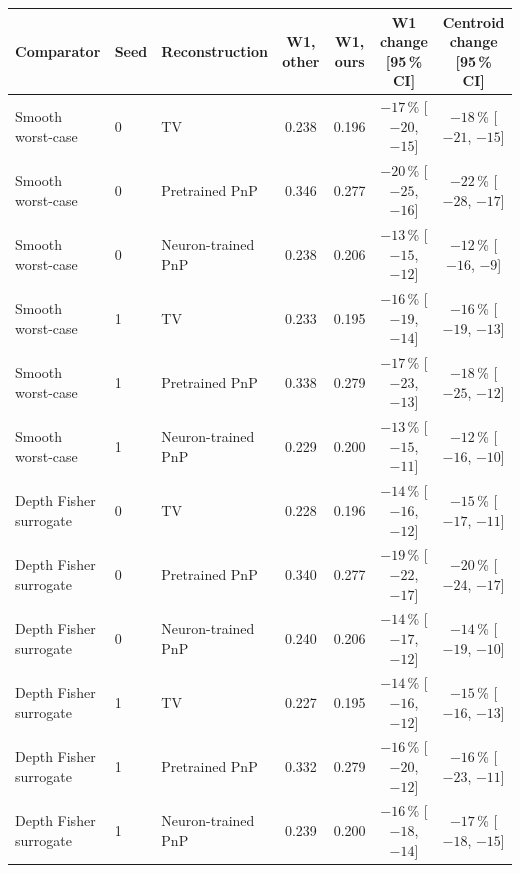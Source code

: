 \begin{tabular}{@{}lllcccc@{}}
\toprule
Comparator & Seed & Reconstruction & W1, other & W1, ours & W1 change [95\,\% CI] & Centroid change [95\,\% CI]\\
\midrule
Smooth worst-case & 0 & TV & 0.238 & 0.196 & $-17$\,\% [$-20$, $-15$] & $-18$\,\% [$-21$, $-15$]\\
Smooth worst-case & 0 & Pretrained PnP & 0.346 & 0.277 & $-20$\,\% [$-25$, $-16$] & $-22$\,\% [$-28$, $-17$]\\
Smooth worst-case & 0 & Neuron-trained PnP & 0.238 & 0.206 & $-13$\,\% [$-15$, $-12$] & $-12$\,\% [$-16$, $-9$]\\
Smooth worst-case & 1 & TV & 0.233 & 0.195 & $-16$\,\% [$-19$, $-14$] & $-16$\,\% [$-19$, $-13$]\\
Smooth worst-case & 1 & Pretrained PnP & 0.338 & 0.279 & $-17$\,\% [$-23$, $-13$] & $-18$\,\% [$-25$, $-12$]\\
Smooth worst-case & 1 & Neuron-trained PnP & 0.229 & 0.200 & $-13$\,\% [$-15$, $-11$] & $-12$\,\% [$-16$, $-10$]\\
Depth Fisher surrogate & 0 & TV & 0.228 & 0.196 & $-14$\,\% [$-16$, $-12$] & $-15$\,\% [$-17$, $-11$]\\
Depth Fisher surrogate & 0 & Pretrained PnP & 0.340 & 0.277 & $-19$\,\% [$-22$, $-17$] & $-20$\,\% [$-24$, $-17$]\\
Depth Fisher surrogate & 0 & Neuron-trained PnP & 0.240 & 0.206 & $-14$\,\% [$-17$, $-12$] & $-14$\,\% [$-19$, $-10$]\\
Depth Fisher surrogate & 1 & TV & 0.227 & 0.195 & $-14$\,\% [$-16$, $-12$] & $-15$\,\% [$-16$, $-13$]\\
Depth Fisher surrogate & 1 & Pretrained PnP & 0.332 & 0.279 & $-16$\,\% [$-20$, $-12$] & $-16$\,\% [$-23$, $-11$]\\
Depth Fisher surrogate & 1 & Neuron-trained PnP & 0.239 & 0.200 & $-16$\,\% [$-18$, $-14$] & $-17$\,\% [$-18$, $-15$]\\
\bottomrule
\end{tabular}
